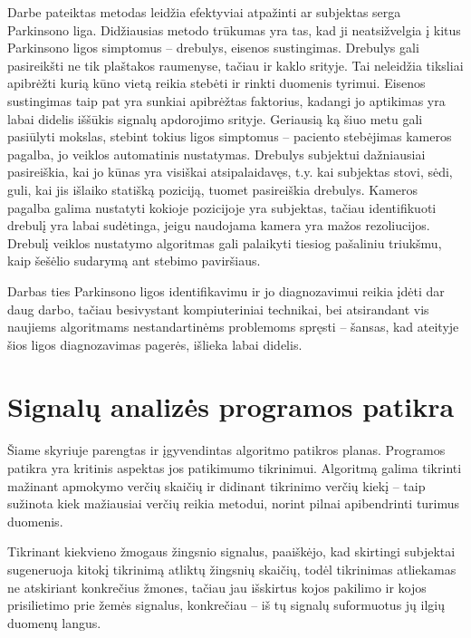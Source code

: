 \documentclass[]{vgtuef}
\begin{document}
Darbe pateiktas metodas leidžia efektyviai atpažinti ar subjektas serga Parkinsono liga. Didžiausias metodo trūkumas yra tas, kad ji neatsižvelgia į kitus Parkinsono ligos simptomus -- drebulys, eisenos sustingimas. Drebulys gali pasireikšti ne tik plaštakos raumenyse, tačiau ir kaklo srityje. Tai neleidžia tiksliai apibrėžti kurią kūno vietą reikia stebėti ir rinkti duomenis tyrimui. Eisenos sustingimas taip pat yra sunkiai apibrėžtas faktorius, kadangi jo aptikimas yra labai didelis iššūkis signalų apdorojimo srityje. Geriausią ką šiuo metu gali pasiūlyti mokslas, stebint tokius ligos simptomus -- paciento stebėjimas kameros pagalba, jo veiklos automatinis nustatymas. Drebulys subjektui dažniausiai pasireiškia, kai jo kūnas yra visiškai atsipalaidavęs, t.y. kai subjektas stovi, sėdi, guli, kai jis išlaiko statišką poziciją, tuomet pasireiškia drebulys. Kameros pagalba galima nustatyti kokioje pozicijoje yra subjektas, tačiau identifikuoti drebulį yra labai sudėtinga, jeigu naudojama kamera yra mažos rezoliucijos. Drebulį veiklos nustatymo algoritmas gali palaikyti tiesiog pašaliniu triukšmu, kaip šešėlio sudarymą ant stebimo paviršiaus. 

Darbas ties Parkinsono ligos identifikavimu ir jo diagnozavimui reikia įdėti dar daug darbo, tačiau besivystant kompiuteriniai technikai, bei atsirandant vis naujiems algoritmams nestandartinėms problemoms spręsti -- šansas, kad ateityje šios ligos diagnozavimas pagerės, išlieka labai didelis.

\section{Signalų analizės programos patikra}

Šiame skyriuje parengtas ir įgyvendintas algoritmo patikros planas. Programos patikra yra kritinis aspektas jos patikimumo tikrinimui. Algoritmą galima tikrinti mažinant apmokymo verčių skaičių ir didinant tikrinimo verčių kiekį -- taip sužinota kiek mažiausiai verčių reikia metodui, norint pilnai apibendrinti turimus duomenis.

Tikrinant kiekvieno žmogaus žingsnio signalus, paaiškėjo, kad skirtingi subjektai sugeneruoja kitokį tikrinimą atliktų žingsnių skaičių, todėl tikrinimas atliekamas ne atskiriant konkrečius žmones, tačiau jau išskirtus kojos pakilimo ir kojos prisilietimo prie žemės signalus, konkrečiau -- iš tų signalų suformuotus jų ilgių duomenų langus.
\end{document}
